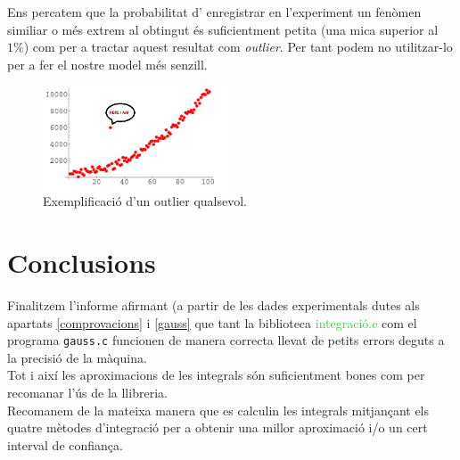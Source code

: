 \documentclass[12pt]{article}
\begin{document}
\begin{itemize}
    Ens percatem que la probabilitat d' enregistrar en l'experiment un fenòmen similiar o més extrem al obtingut és suficientment petita (una mica superior al $1\%$) com per a tractar aquest resultat com \textit{outlier}. Per tant podem no utilitzar-lo per a fer el nostre model més senzill.\\
    \begin{figure}[h]
        \centering
        \includegraphics[width = 0.49\textwidth]{outlier.png}
        \caption{Exemplificació d'un outlier qualsevol.}
        \label{fig:my_label}
    \end{figure}
    
\end{itemize}

\newpage
\section{Conclusions}
Finalitzem l'informe afirmant (a partir de les dades experimentals dutes als apartats \textcolor{blue}{\ref{comprovacions}} i \textcolor{blue}{\ref{gauss}} que tant la biblioteca \textcolor{LimeGreen}{integració.c} com el programa \texttt{gauss.c} funcionen de manera correcta llevat de petits errors deguts a la precisió de la màquina.\\
Tot i així les aproximacions de les integrals són suficientment bones com per recomanar l'ús de la llibreria.\\
Recomanem de la mateixa manera que es calculin les integrals mitjançant els quatre mètodes d'integració per a obtenir una millor aproximació i/o un cert interval de confiança.
\end{document}
